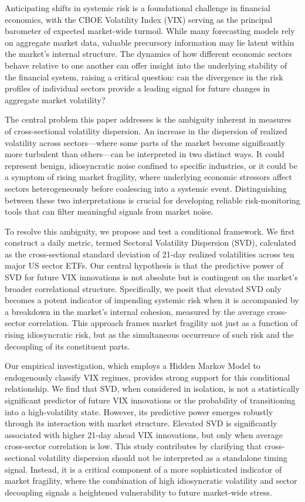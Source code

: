 \documentclass[]{article}
\begin{document}
Anticipating shifts in systemic risk is a foundational challenge in financial economics, with the CBOE Volatility Index (VIX) serving as the principal barometer of expected market-wide turmoil. While many forecasting models rely on aggregate market data, valuable precursory information may lie latent within the market's internal structure. The dynamics of how different economic sectors behave relative to one another can offer insight into the underlying stability of the financial system, raising a critical question: can the divergence in the risk profiles of individual sectors provide a leading signal for future changes in aggregate market volatility?

The central problem this paper addresses is the ambiguity inherent in measures of cross-sectional volatility dispersion. An increase in the dispersion of realized volatility across sectors—where some parts of the market become significantly more turbulent than others—can be interpreted in two distinct ways. It could represent benign, idiosyncratic noise confined to specific industries, or it could be a symptom of rising market fragility, where underlying economic stressors affect sectors heterogeneously before coalescing into a systemic event. Distinguishing between these two interpretations is crucial for developing reliable risk-monitoring tools that can filter meaningful signals from market noise.

To resolve this ambiguity, we propose and test a conditional framework. We first construct a daily metric, termed Sectoral Volatility Dispersion (SVD), calculated as the cross-sectional standard deviation of 21-day realized volatilities across ten major US sector ETFs. Our central hypothesis is that the predictive power of SVD for future VIX innovations is not absolute but is contingent on the market's broader correlational structure. Specifically, we posit that elevated SVD only becomes a potent indicator of impending systemic risk when it is accompanied by a breakdown in the market's internal cohesion, measured by the average cross-sector correlation. This approach frames market fragility not just as a function of rising idiosyncratic risk, but as the simultaneous occurrence of such risk and the decoupling of its constituent parts.

Our empirical investigation, which employs a Hidden Markov Model to endogenously classify VIX regimes, provides strong support for this conditional relationship. We find that SVD, when considered in isolation, is not a statistically significant predictor of future VIX innovations or the probability of transitioning into a high-volatility state. However, its predictive power emerges robustly through its interaction with market structure. Elevated SVD is significantly associated with higher 21-day ahead VIX innovations, but only when average cross-sector correlation is low. This study contributes by clarifying that cross-sectional volatility dispersion should not be interpreted as a standalone timing signal. Instead, it is a critical component of a more sophisticated indicator of market fragility, where the combination of high idiosyncratic volatility and sector decoupling signals a heightened vulnerability to future market-wide stress.
\end{document}
